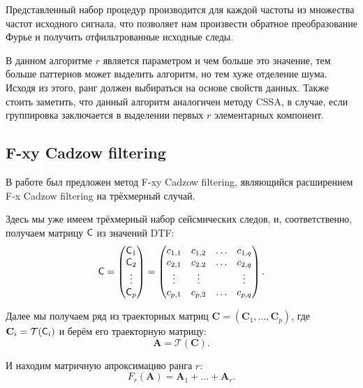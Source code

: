 \documentclass[specialist,
               substylefile = spbu.rtx,
               subf,href,colorlinks=true, 12pt]{disser}
\begin{document}
Представленный набор процедур производится для каждой частоты из множества частот исходного сигнала, что позволяет нам произвести обратное преобразование Фурье и получить отфильтрованные исходные следы.

В данном алгоритме $r$ является параметром и чем больше это значение, тем больше паттернов может выделить алгоритм, но тем хуже отделение шума. Исходя из этого, ранг должен выбираться на основе свойств данных. Также стоить заметить, что данный алгоритм аналогичен методу CSSA, в случае, если группировка заключается в выделении первых $r$ элементарных компонент.

\subsection{F-xy Cadzow filtering}
\label{sub:fxy}

В работе \cite{Trickett2008} был предложен метод F-xy Cadzow filtering, являющийся расширением F-x Cadzow filtering на трёхмерный случай.

Здесь мы уже имеем трёхмерный набор сейсмических следов, и, соответственно, получаем матрицу $\textsf{C}$ из значений DTF:
$$\textsf{C} = 
\begin{pmatrix}
           \textsf{C}_1 \\
           \textsf{C}_2\\
           \vdots\\
           \textsf{C}_p
         \end{pmatrix}
= \begin{pmatrix}
           c_{1,1} & c_{1,2} & \ldots & c_{1,q}\\
           c_{2,1} & c_{2.2} & \ldots & c_{2,q}\\
           \vdots & \vdots & & \vdots\\
           c_{p,1} & c_{p,2} & \ldots & c_{p,q}
         \end{pmatrix}.$$

Далее мы получаем ряд из траекторных матриц $\mathbf{C} = (\mathbf{C}_1, \ldots, \mathbf{C}_p)$, где $\mathbf{C}_i = \mathcal{T}(\textsf{C}_i)$ и берём его траекторную матрицу:
$$\mathbf{A} = \mathcal{T}(\mathbf{C}).$$

И находим матричную апроксимацию ранга $r$:
$$F_r(\mathbf{A}) = \mathbf{A}_1 + \ldots + \mathbf{A}_r.$$
\end{document}

